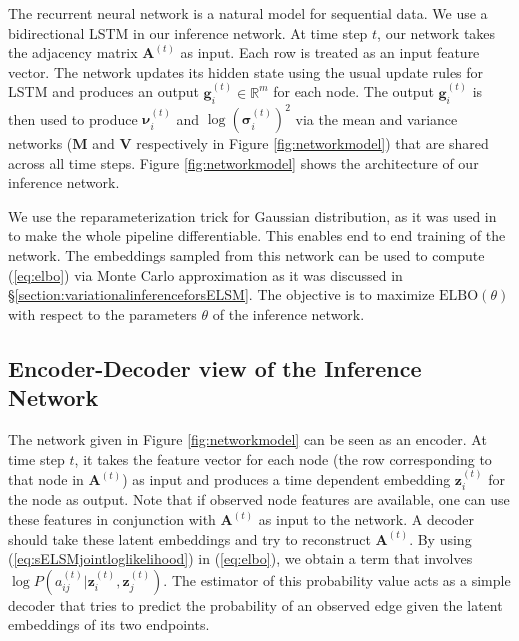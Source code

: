 \documentclass[letterpaper]{article} %
\begin{document}
The recurrent neural network is a natural model for sequential data. We use a bidirectional LSTM in our inference network. At time step ${t}$, our network takes the adjacency matrix $\mathbf{A}^{(t)}$ as input. Each row is treated as an input feature vector. The network updates its hidden state using the usual update rules for LSTM and produces an output $\mathbf{g}_i^{(t)} \in \mathbb{R}^{m}$ for each node. The output $\mathbf{g}_i^{(t)}$ is then used to produce $\bm{\nu}_i^{(t)}$ and $\log {(\bm{\sigma}_i^{(t)})^2}$ via the mean and variance networks (${\mathbf{M}}$ and ${\mathbf{V}}$ respectively in Figure \ref{fig:networkmodel}) that are shared across all time steps. Figure \ref{fig:networkmodel} shows the architecture of our inference network.

We use the reparameterization trick for Gaussian distribution, as it was used in \cite{KingmaEtAl:2013:AutoEncodingVariationalBayes} to make the whole pipeline differentiable. This enables end to end training of the network. The embeddings sampled from this network can be used to compute ({\ref{eq:elbo}}) via Monte Carlo approximation as it was discussed in \S \ref{section:variationalinferenceforsELSM}. The objective is to maximize $\mathrm{ELBO}(\theta)$ with respect to the parameters $\theta$ of the inference network.


\subsection{Encoder-Decoder view of the Inference Network}
\label{section:encoderdecoderviewofinferencenetwork}
The network given in Figure \ref{fig:networkmodel} can be seen as an encoder. At time step ${t}$, it takes the feature vector for each node (the row corresponding to that node in $\mathbf{A}^{(t)}$) as input and produces a time dependent embedding $\mathbf{z}_i^{(t)}$ for the node as output. Note that if observed node features are available, one can use these features in conjunction with $\mathbf{A}^{(t)}$ as input to the network. A decoder should take these latent embeddings and try to reconstruct $\mathbf{A}^{(t)}$. By using (\ref{eq:sELSMjointloglikelihood}) in (\ref{eq:elbo}), we obtain a term that involves $\log P({a_{ij}^{(t)}} | \mathbf{z}_{i}^{(t)}, \mathbf{z}_{j}^{(t)})$. The estimator of this probability value acts as a simple decoder that tries to predict the probability of an observed edge given the latent embeddings of its two endpoints.
\end{document}

